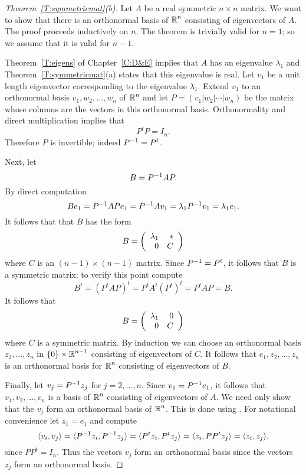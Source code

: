 \documentclass{ximera}
\begin{document}
\begin{proof}[Theorem~\ref{T:symmetricmat}(b)]
Let $A$ be a real symmetric $n\times n$ matrix.  We want to show that there
is an orthonormal basis of $\mbox{$\Bbb{R}$}^n$ consisting of eigenvectors of $A$.  The
proof proceeds inductively on $n$.   The theorem is trivially valid for
$n=1$; so we assume that it is valid for $n-1$.

Theorem~\ref{T:eigens} of Chapter~\ref{C:D&E} implies that $A$ has an 
eigenvalue $\lambda_1$ and Theorem~\ref{T:symmetricmat}(a) states that 
this eigenvalue is real.
Let $v_1$ be a unit length eigenvector corresponding to the eigenvalue
$\lambda_1$.  Extend $v_1$ to an orthonormal basis $v_1,w_2,\ldots,w_n$ of
$\mbox{$\Bbb{R}$}^n$ and let $P=(v_1|w_2|\cdots|w_n)$ be the matrix whose columns are the
vectors in this orthonormal basis.  Orthonormality and direct multiplication
implies that
\begin{equation}  \label{e:orthosym}
P^tP=I_n.
\end{equation}
Therefore $P$ is invertible; indeed $P^{-1}=P^t$.

Next, let
\[
B= P^{-1} AP.
\]
By direct computation
\[
Be_1 = P^{-1} APe_1 = P^{-1} Av_1 = \lambda_1 P^{-1} v_1=\lambda_1e_1.
\]
It follows that that $B$ has the form
\[
B = \left(\begin{array}{rr} \lambda_1 & *\\ 0 &C\end{array}\right)
\]
where $C$ is an $(n-1)\times (n-1)$ matrix.   Since $P^{-1}=P^t$, it follows
that $B$ is a symmetric matrix; to verify this point compute
\[
B^t = (P^t AP)^t = P^t A^t (P^t)^t = P^tAP = B.
\]
It follows that
\[
B =\left(\begin{array}{rr} \lambda_1 & 0\\ 0 &C\end{array}\right)
\]
where $C$ is a symmetric matrix.  By induction we can choose an orthonormal
basis $z_2,\ldots,z_n$ in $\{0\}\times\mbox{$\Bbb{R}$}^{n-1}$ consisting of eigenvectors
of $C$.  It follows that $e_1,z_2,\ldots,z_n$ is an orthonormal basis for
$\mbox{$\Bbb{R}$}^n$ consisting of eigenvectors of $B$.

Finally, let $v_j=P^{-1} z_j$ for $j=2,\ldots,n$.  Since $v_1=P^{-1} e_1$,
it follows that  $v_1,v_2,\ldots,v_n$ is a basis of $\mbox{$\Bbb{R}$}^n$ consisting of
eigenvectors of $A$.  We need only show that the $v_j$ form an orthonormal
basis of $\mbox{$\Bbb{R}$}^n$.   This is done using .  For notational
convenience let $z_1=e_1$ and compute
\[
\langle v_i,v_j \rangle  =\langle P^{-1} z_i,P^{-1} z_j\rangle =
\langle P^tz_i, P^tz_j \rangle = \langle z_i, PP^t z_j \rangle =
\langle z_i,z_j \rangle,
\]
since $PP^t= I_n$.  Thus the vectors $v_j$ form an orthonormal basis since
the vectors $z_j$ form an orthonormal basis.  \end{proof}
\end{document}
